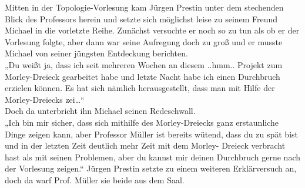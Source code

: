 \documentclass[oneside]{memoir}
\begin{document}
Mitten in der Topologie-Vorlesung kam Jürgen Prestin unter dem stechenden Blick des Professors herein und setzte sich möglichst leise zu seinem Freund Michael in die vorletzte Reihe. Zunächst versuchte er noch so zu tun als ob er der Vorlesung folgte, aber dann war seine Aufregung doch zu groß und er musste Michael von seiner jüngsten Entdeckung berichten. \\
 „Du weißt ja, dass ich seit mehreren Wochen an diesem ..hmm.. Projekt zum Morley-Dreieck gearbeitet habe und letzte Nacht habe ich einen Durchbruch erzielen können. Es hat sich nämlich herausgestellt, dass man mit Hilfe der Morley-Dreiecks zei\ldots“  \\
Doch da unterbricht ihn Michael seinen Redeschwall. \\
„Ich bin mir sicher, dass sich mithilfe des Morley-Dreiecks ganz erstaunliche Dinge zeigen kann, aber Professor Müller ist bereits wütend, dass du zu spät bist und in der letzten Zeit deutlich mehr Zeit mit dem Morley- Dreieck verbracht hast als mit seinen Problemen, aber du kannst mir deinen Durchbruch gerne nach der Vorlesung zeigen.“ Jürgen Prestin setzte zu einem weiteren Erklärversuch an, doch da warf Prof. Müller sie beide aus dem Saal.
 
\end{document}
